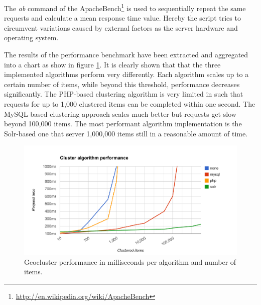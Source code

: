 The \textit{ab} command of the ApacheBench\footnote{\url{http://en.wikipedia.org/wiki/ApacheBench}} is used to sequentially repeat the same requests and calculate a mean response time value. Hereby the script tries to circumvent variations caused by external factors as the server hardware and operating system.

The results of the performance benchmark have been extracted and aggregated into a chart as show in figure \ref{fig:algorithm-performance}. It is clearly shown that that the three implemented algorithms perform very differently. Each algorithm scales up to a certain number of items, while beyond this threshold, performance decreases significantly. The PHP-based clustering algorithm is very limited in such that requests for up to 1,000 clustered items can be completed within one second. The MySQL-based clustering approach scales much better but requests get slow beyond 100,000 items. The most performant algorithm implementation is the Solr-based one that server 1,000,000 items still in a reasonable amount of time. 

\begin{figure}[h]
  \begin{center}
    \includegraphics[width=1.2\textwidth]{figures/geocluster_algorithm_performance.pdf}
    \caption{Geocluster performance in milliseconds per algorithm and number of items.}
    \label{fig:algorithm-performance}
  \end{center}
\end{figure}

